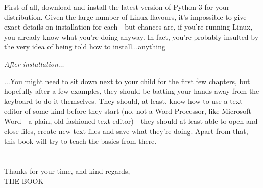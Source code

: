 \begin{LINUX}

\noindent
First of all, download and install the latest version of Python 3 for your distribution.  Given the large number of Linux flavours, it's impossible to give exact details on installation for each---but chances are, if you're running Linux, you already know what you're doing anyway.  In fact, you're probably insulted by the very idea of being told how to install$\ldots$anything

\end{LINUX}

\noindent
\emph{\color{BrickRed}After installation$\ldots$}

\noindent
$\ldots$You might need to sit down next to your child for the first few chapters, but hopefully after a few examples, they should be batting your hands away from the keyboard to do it themselves.  They should, at least, know how to use a text editor of some kind before they start (no, not a Word Processor, like Microsoft Word---a plain, old-fashioned text editor)---they should at least able to open and close files, create new text files and save what they're doing.  Apart from that, this book will try to teach the basics from there.
\\
\\
\noindent\\
Thanks for your time, and kind regards,
\noindent\\
THE BOOK